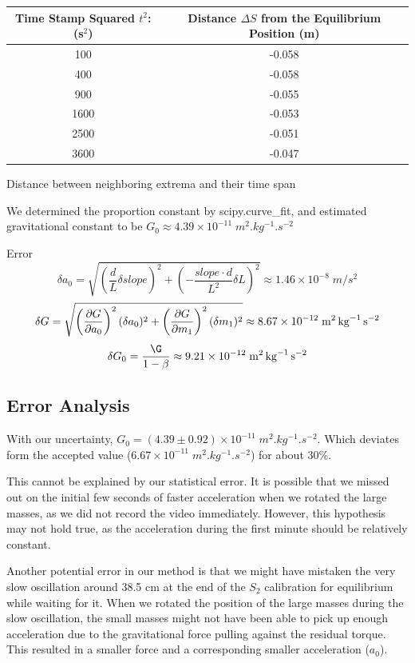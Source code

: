 \documentclass[a4paper]{tufte-handout}
\begin{document}
\begin{center}
        \centering
        \begin{tabular}{|c |c |}
            \hline
        Time Stamp Squared $t^2$:  (s$^2$) & Distance $\Delta S$ from the Equilibrium Position (m) \\
\hline     \hline
            100 & -0.058\\
            \hline
            400 & -0.058\\
            \hline
            900 & -0.055\\
             \hline
            1600 & -0.053 \\
            \hline
            2500 & -0.051 \\
            \hline
            3600 &  -0.047\\
            \hline
        \end{tabular}
        \caption {Distance between neighboring extrema and their time span}
        \label{tab:my_label}
\end{center}
We determined the proportion constant by scipy.curve\_fit, and estimated gravitational constant to be $G_0 \approx 4.39 \times 10^{-11} \; \si{m^2.kg^{-1}.s^{-2}}$

Error
$$\delta a_0 = \sqrt{\left(\frac{d}{L}\delta \si{slope}\right)^2+\left(-\frac{\si{slope} \cdot d}{L^2}\delta L\right)^2}\approx 1.46\times 10^{-8} \;\si{m/s^2}$$
$$\delta G = \sqrt{\left(\pdv{G}{a_0} \right)^2 (\delta a_0)^2 + \left(\pdv{G}{m_1} \right)^2 (\delta m_1)^2 }\approx 8.67\times 10^{-12}\; \si{m^2.kg^{-1}.s^{-2}}$$
$$\delta G_0 = \frac{\G}{1-\beta} \approx 9.21\times 10^{-12} \; \si{m^2.kg^{-1}.s^{-2}}$$

\subsection{Error Analysis}
With our uncertainty, $G_0 = (4.39\pm 0.92)\times 10^{-11}\;\si{m^2.kg^{-1}.s^{-2}}$. Which deviates form the accepted value ($6.67\times 10^{-11}\;\si{m^2.kg^{-1}.s^{-2}}$) for about $30\%$. 

This cannot be explained by our statistical error. It is possible that we missed out on the initial few seconds of faster acceleration when we rotated the large masses, as we did not record the video immediately. However, this hypothesis may not hold true, as the acceleration during the first minute should be relatively constant.

Another potential error in our method is that we might have mistaken the very slow oscillation around 38.5 cm at the end of the $S_2$ calibration for equilibrium while waiting for it. When we rotated the position of the large masses during the slow oscillation, the small masses might not have been able to pick up enough acceleration due to the gravitational force pulling against the residual torque. This resulted in a smaller force and a corresponding smaller acceleration ($a_0$).
\end{document}
